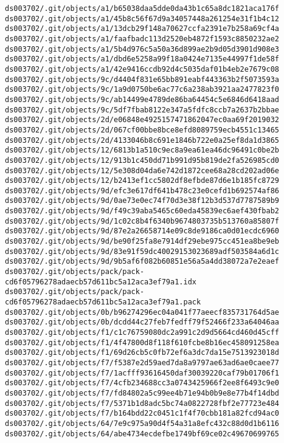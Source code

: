 \documentclass[11pt]{article}
\begin{document}
\begin{Verbatim}[commandchars=\\\{\}]
ds003702/.git/objects/a1/b65038daa5dde0da43b1c65a8dc1821aca176f
ds003702/.git/objects/a1/45b8c56f67d9a34057448a261254e31f1b4c12
ds003702/.git/objects/a1/13dcb29f148a70627ccfa2391e7b258a69cf4a
ds003702/.git/objects/a1/faafbadc113d2520eb4872f1593c8850232ae2
ds003702/.git/objects/a1/5b4d976c5a50a36d899ae2b9d05d3901d908e3
ds003702/.git/objects/a1/dbd6e5258a99f18a0424e7135e44997f1de58f
ds003702/.git/objects/a1/42e9416ccdb92d4c5035daf01b4eb2e7679c08
ds003702/.git/objects/9c/d4404f831e65bb891eabf443363b2f5073593a
ds003702/.git/objects/9c/1a9d0750be6ac77c6a238ab3921aa2477823f0
ds003702/.git/objects/9c/ab14499e4789de86ba64454c5e6846d6418aad
ds003702/.git/objects/9c/5df7fbab8122e347a5fdfc8ccb7a2637b2bbae
ds003702/.git/objects/2d/e06848e4925157471862047ec0aa69f2019032
ds003702/.git/objects/2d/067cf00bbe8bce8efd8089759ecb4551c13465
ds003702/.git/objects/2d/4133046b8c691e1846b722e0a25ef8da1d3865
ds003702/.git/objects/12/6813b1a510c9ec8a9ea61ea46dc96491c0be2b
ds003702/.git/objects/12/913b1c450dd71b991d95b819de2fa526985cd0
ds003702/.git/objects/12/5e308d04da6e742d1872cee68a28cd202ad06e
ds003702/.git/objects/12/b2413ef1cc5802df8efbde87d6e1b185fc8729
ds003702/.git/objects/9d/efc3e617df641b478c23e0cefd1b692574af86
ds003702/.git/objects/9d/0ae73e0ec74f70d3e38f12b3d537d7787589b9
ds003702/.git/objects/9d/f49c39aba5465c60eda45839ec6aef430fbab2
ds003702/.git/objects/9d/1c02c8b4f6340b9674803735b513760a85807f
ds003702/.git/objects/9d/87e2a26658714e09c8de9186ca0d01ecdc6960
ds003702/.git/objects/9d/be90f25fa8e7914df29ebe975cc451ea8be9eb
ds003702/.git/objects/9d/83e91f59dc40029153023689adf503584a6d1c
ds003702/.git/objects/9d/9b5af6f082b60851e56a5a4dd38072a7e2eaef
ds003702/.git/objects/pack/pack-
cd6f05796278adaecb57d611bc5a12aca3ef79a1.idx
ds003702/.git/objects/pack/pack-
cd6f05796278adaecb57d611bc5a12aca3ef79a1.pack
ds003702/.git/objects/0b/b96274296ec04a041f77aeecf835731764d5ae
ds003702/.git/objects/0b/dcdd44c27feb7fedff79f52466f233a64046aa
ds003702/.git/objects/f1/c1c76759080dc2a991c2d9d5664cd460d45cff
ds003702/.git/objects/f1/4f47800d8f118f610fcbe8b16ec458091258ea
ds003702/.git/objects/f1/69d26cb5c0fb72ef6a3dc7da15e7513923018d
ds003702/.git/objects/f7/f5387e2d59aed7da8a9797ae63ad6ae0caee77
ds003702/.git/objects/f7/1acfff93616450daf30039220caf79b01706f1
ds003702/.git/objects/f7/4cfb234688cc3a0743425966f2ee8f6493c9e0
ds003702/.git/objects/f7/fd84802a5c99ee4b71e94b0b9e8e77b4f14dbd
ds003702/.git/objects/f7/5371b1d8adc5bc74a0822728fbf2e77723e484
ds003702/.git/objects/f7/b164bdd22c0451c1f4f70cbb181a82fcd94ac0
ds003702/.git/objects/64/7e9c975a90d4f54a31a8efc432c88d0d1b6116
ds003702/.git/objects/64/abe4734ecdefbe1749bf69ce02c49670699765

\end{Verbatim}
\end{document}
